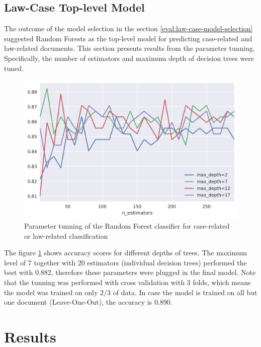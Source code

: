 \documentclass[
  digital, %
  notable,   %
  nolof,     %
  nolot,     %
  draft
]{fithesis3}
\begin{document}
\subsection{Law-Case Top-level Model}
\label{eval:law-case-model-tuning}
The outcome of the model selection in the section \ref{eval:law-case-model-selection} suggested Random Forests as the top-level model for predicting case-related and law-related documents. This section presents results from the parameter tunning.
Specifically, the number of estimators and maximum depth of decision trees were tuned.

\begin{figure}[h]
\caption{Parameter tunning of the Random Forest classifier for case-related or law-related classification}
\label{fig:eval_law-case-model-tunning}
\includegraphics[width=\textwidth]{img/eval_law-case-model-tunning}
\end{figure}

The figure \ref{fig:eval_law-case-model-tunning} shows accuracy scores for different depths of trees.
The maximum level of 7 together with 20 estimators (individual decision trees) performed the best with 0.882, therefore these parameters were plugged in the final model.
Note that the tunning was performed with cross validation with 3 folds, which means the model was trained on only $2/3$ of data.
In case the model is trained on all but one document (Leave-One-Out), the accuracy is 0.890.

\section{Results}
\end{document}
